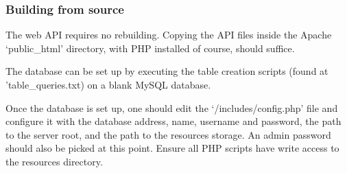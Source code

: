     \subsubsection{Building from source}
        The web API requires no rebuilding. Copying the API files inside the Apache `public\_html' directory, with PHP installed of course, should suffice.
    
        The database can be set up by executing the table creation scripts (found at 'table\_queries.txt) on a blank MySQL database.
    
        Once the database is set up, one should edit the `/includes/config.php' file and configure it with the database address, name, username and password, the path to the server root, and the path to the resources storage. An admin password should also be picked at this point. Ensure all PHP scripts have write access to the resources directory.